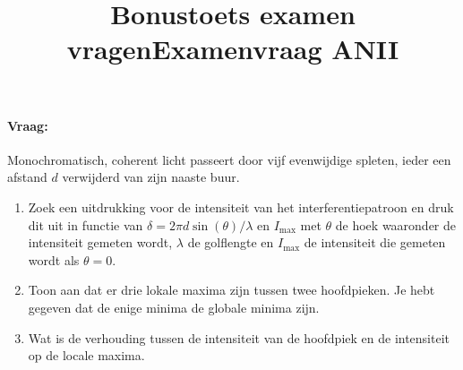 \documentclass[11pt]{article}
\title{Bonustoets examen vragen}
\begin{document}
\title{Examenvraag ANII}
\paragraph{Vraag:} Monochromatisch, coherent licht passeert door vijf evenwijdige spleten, ieder een afstand $d$ verwijderd van zijn naaste buur.
\begin{enumerate}
	\item Zoek een uitdrukking voor de intensiteit van het interferentiepatroon en druk dit uit in functie van $\delta=2\pi d\sin(\theta)/\lambda$ en $I_{\text{max}}$ met $\theta$ de hoek waaronder de intensiteit gemeten wordt, $\lambda$ de golflengte en $I_{\text{max}}$ de intensiteit die gemeten wordt als $\theta=0$.
	\item Toon aan dat er drie lokale maxima zijn tussen twee hoofdpieken. Je hebt gegeven dat de enige minima de globale minima zijn.
	\item Wat is de verhouding tussen de intensiteit van de hoofdpiek en de intensiteit op de locale maxima.
\end{enumerate}
\end{document}
